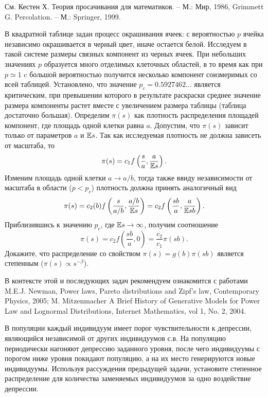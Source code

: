 \begin{remark} 
См. Кестен Х. Теория просачивания для математиков. -- М.: Мир, 1986, Grimmett G. Percolation. -- М.:  Springer, 1999.
\end{remark}



\begin{problem}
В квадратной таблице задан процесс окрашивания ячеек: с вероятностью $p$ ячейка независимо окрашивается в черный цвет, иначе остается белой. Исследуем в такой системе размеры связных компонент из черных ячеек. При небольших значениях $p$ образуется много отделимых клеточных областей, в то время как при $p \simeq 1$ c большой вероятностью получится несколько  компонент соизмеримых со всей таблицей. Установлено, что значение $p_c = 0.5927462\ldots$ является критическим, при превышении которого в результате раскраски  среднее значение размера компоненты растет вместе с увеличением размера таблицы (таблица достаточно большая). Определим $\pi(s)$ как плотность распределения площадей компонент, где площадь одной клетки равна $a$. Допустим, что $\pi(s)$ зависит только от параметров $a$ и $\mathrm{{\mathbb E}} s$. Так как исследуемая плотность не должна зависеть от масштаба, то 
\[
\pi(s) = c_1 f\left( \frac{s}{a}, \frac{a}{\mathrm{{\mathbb E}} s} \right).
\]      
Изменим площадь одной клетки $a \to a/b$, тогда также ввиду независимости от масштаба в области ($p < p_c$) плотность должна принять аналогичный вид  
\[
\pi(s) = c_2(b) f\left( \frac{s}{a/b}, \frac{a/b}{\mathrm{{\mathbb E}} s} \right) = c_2 f\left( \frac{sb}{a}, \frac{a}{\mathrm{{\mathbb E}} sb} \right) .
\]
Приблизившись к значению $p_c$, где $\mathrm{{\mathbb E}} s \to \infty$, получим соотношение
\[
\pi(s) = c_2 f\left( \frac{sb}{a}, 0 \right) = \frac{c_2}{c_1} \pi(sb).
\]
Докажите, что распределение со свойством $\pi(s) = g(b) \pi(sb)$  является степенным ($\pi(s) \propto s^{-\beta}$).
\end{problem}

\begin{remark}
В контексте этой и последующих задач рекомендуем ознакомится с работами M.E.J. Newman, Power laws, Pareto distributions and Zipf’s law, Contemporary Physics, 2005; M. Mitzenmacher
A Brief History of Generative Models for Power Law and Lognormal Distributions, Internet Mathematics, vol 1, No. 2, 2004.
\end{remark}

\begin{problem}
\label{depression}
В популяции каждый индивидуум имеет  порог чувствительности к депрессии, являющийся независимой от других индивидуумов с.в. 
На популяцию периодически нагоняют депрессию заданного уровня, после чего индивидуумы с порогом ниже уровня покидают популяцию, а на их место генерируются новые индивидуумы. Используя рассуждения предыдущей задачи, установите степенное распределение для количества заменяемых индивидуумов за одно воздействие депрессии.     
\end{problem}

